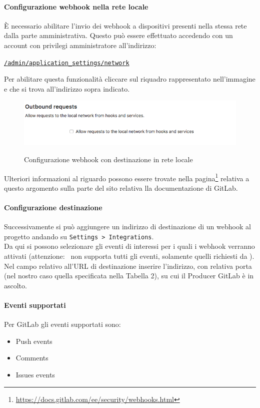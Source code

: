	\paragraph{Configurazione webhook nella rete locale}
	È necessario abilitare l'invio dei webhook a dispositivi presenti nella stessa rete dalla parte amministrativa.
	Questo può essere effettuato accedendo con un account con privilegi amministratore all'indirizzo:
	\begin{center}
		\texttt{\url{/admin/application_settings/network}}
	\end{center}
	Per abilitare questa funzionalità cliccare sul riquadro rappresentato nell'immagine e che si trova all'indirizzo sopra indicato.
	\begin{figure}[H]
		\centering
		\includegraphics[width=13cm]{img/webhook_gitlab_setup.png}\\
		\caption[Webhook, GitLab]{Configurazione webhook con destinazione in rete locale}
	\end{figure}
	Ulteriori informazioni al riguardo possono essere trovate nella pagina\footnote{\url{https://docs.gitlab.com/ee/security/webhooks.html}} relativa a questo argomento sulla parte del sito relativa lla documentazione di GitLab.	

	\paragraph{Configurazione destinazione}
	Successivamente si può aggiungere un indirizzo di destinazione di un webhook al progetto andando su \texttt{Settings > Integrations}.\\
	Da qui si possono selezionare gli eventi di interessi per i quali i webhook verranno attivati (attenzione: \progetto~non supporta tutti gli eventi, solamente quelli richiesti da \II).\\
	Nel campo relativo all'URL di destinazione inserire l'indirizzo, con relativa porta (nel nostro caso quella specificata nella Tabella 2), su cui il Producer GitLab è in ascolto.
	\paragraph{Eventi supportati}
	Per GitLab gli eventi supportati sono:
	\begin{itemize}
		\item Push events
		\item Comments
		\item Issues events
	\end{itemize}

